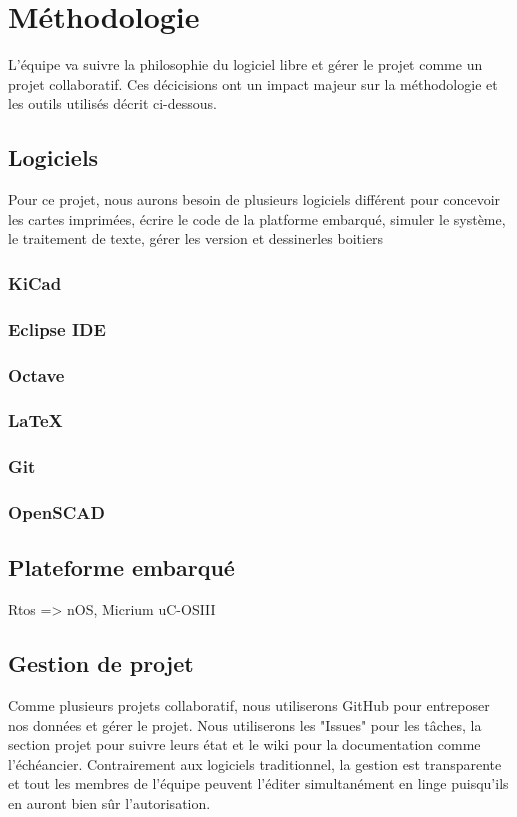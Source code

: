 \section{Méthodologie}
L'équipe va suivre la philosophie du logiciel libre et gérer le projet comme un projet collaboratif. Ces décicisions 
ont un impact majeur sur la méthodologie et les outils utilisés décrit ci-dessous. \\

\subsection{Logiciels}
Pour ce projet, nous aurons besoin de plusieurs logiciels différent pour concevoir les cartes imprimées, écrire le code de la platforme embarqué, simuler le système, le traitement de texte, gérer les version et dessinerles boitiers\\

\subsubsection{KiCad}

\subsubsection{Eclipse IDE}
\subsubsection{Octave}
\subsubsection{LaTeX}
\subsubsection{Git}
\subsubsection{OpenSCAD}



\subsection{Plateforme embarqué}
Rtos => nOS, Micrium uC-OSIII
\subsection{Gestion de projet}
Comme plusieurs projets collaboratif, nous utiliserons GitHub pour entreposer nos données et gérer le projet. Nous utiliserons les "Issues" pour les tâches, la section projet pour suivre leurs état et le wiki pour la documentation comme l'échéancier. Contrairement aux logiciels traditionnel, la gestion est transparente et tout les membres de l'équipe peuvent l'éditer simultanément en linge puisqu'ils en auront bien sûr l'autorisation. 
